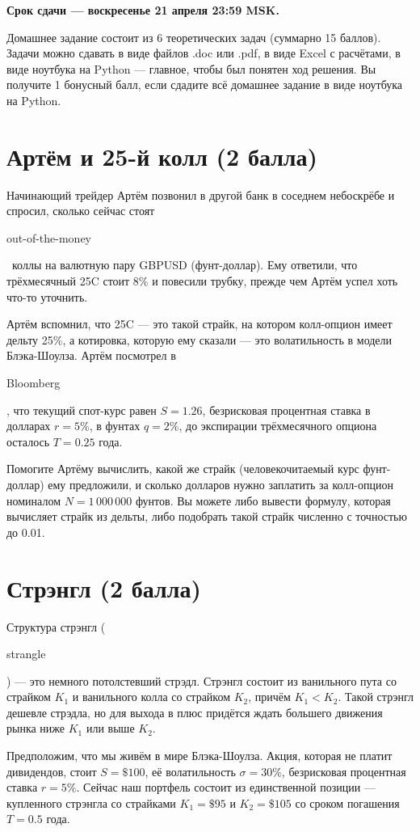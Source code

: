 \documentclass[a4paper,14pt]{extarticle}
\newcommand{\en}[1]{\begin{otherlanguage}{english}#1\end{otherlanguage}}
\begin{document}
\noindent \textbf{Срок сдачи --- воскресенье 21 апреля 23:59 MSK.}

\vspace{\baselineskip}

\noindent Домашнее задание состоит из 6 теоретических задач (суммарно 15 баллов). Задачи 
можно сдавать в виде файлов .doc или .pdf, в виде Excel с расчётами, в виде ноутбука на Python --- главное, чтобы был понятен ход решения. Вы получите 1 бонусный балл, если сдадите всё домашнее задание в виде ноутбука на Python.

\section{Артём и 25-й колл (2 балла)}

Начинающий трейдер Артём позвонил в другой банк в соседнем небоскрёбе и спросил, сколько сейчас стоят \en{out-of-the-money}\ коллы на валютную пару GBPUSD (фунт-доллар). Ему ответили, что трёхмесячный 25C стоит 8\% и повесили трубку, прежде чем Артём успел хоть что-то уточнить.

Артём вспомнил, что 25C --- это такой страйк, на котором колл-опцион имеет дельту 25\%, а котировка, которую ему сказали --- это волатильность в модели Блэка-Шоулза. Артём посмотрел в \en{Bloomberg}, что текущий спот-курс равен $S=1.26$, безрисковая процентная ставка в долларах $r=5\%$, в фунтах $q=2\%$, до экспирации трёхмесячного опциона осталось $T=0.25$ года.

Помогите Артёму вычислить, какой же страйк (человекочитаемый курс фунт-доллар) ему предложили, и сколько долларов нужно заплатить за колл-опцион номиналом $N=1\,000\,000$ фунтов. Вы можете либо вывести формулу, которая вычисляет страйк из дельты, либо подобрать такой страйк численно с точностью до 0.01.

\section{Стрэнгл (2 балла)}

Структура стрэнгл (\en{strangle}) --- это немного потолстевший стрэдл. Стрэнгл состоит из ванильного пута со страйком $K_1$ и ванильного колла со страйком $K_2$, причём $K_1 < K_2$. Такой стрэнгл дешевле стрэдла, но для выхода в плюс придётся ждать большего движения рынка ниже $K_1$ или выше $K_2$.

Предположим, что мы живём в мире Блэка-Шоулза. Акция, которая не платит дивидендов, стоит $S=\$100$, её волатильность $\sigma=30\%$, безрисковая процентная ставка $r=5\%$. Сейчас наш портфель состоит из единственной позиции --- купленного стрэнгла со страйками $K_1=\$95$ и $K_2=\$105$ со сроком погашения $T=0.5$ года.
\end{document}
